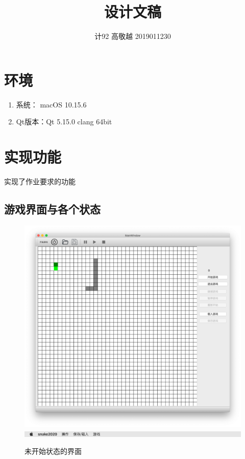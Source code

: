 \documentclass[utf-8]{ctexart}
\begin{document}
\title{设计文稿}
\author{计92 高敬越 2019011230}
\date{ }
    \maketitle
    \vspace{-2em}
    \section{环境}
    \begin{enumerate}
        \item 系统： macOS 10.15.6
        \item Qt版本：Qt 5.15.0 clang 64bit 
    \end{enumerate}
    \section{实现功能}
    实现了作业要求的功能
    \subsection{游戏界面与各个状态}
    \begin{figure}[H]
        \centering
        \includegraphics[scale = 0.2]{texsrc/界面+wall.png}
        \includegraphics[scale = 0.4]{texsrc/菜单栏.png}
        \caption{未开始状态的界面}
        \label{intialized}
    \end{figure}
\end{document}
